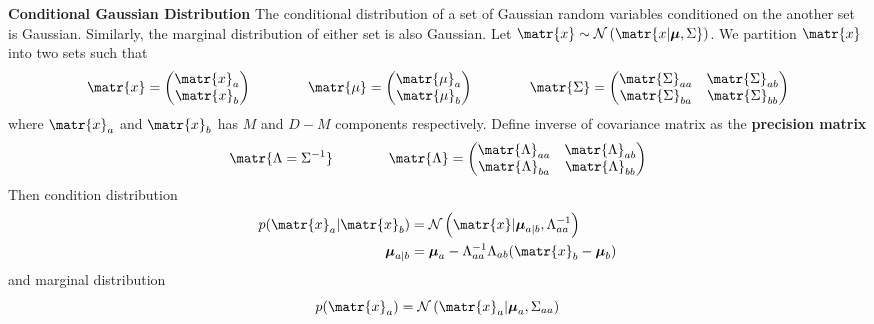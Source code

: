 \documentclass[11pt]{article}
\begin{document}
\begin{defn*}
    \textbf{Conditional Gaussian Distribution} The conditional distribution of a set of Gaussian random variables conditioned on the another set is Gaussian. Similarly, the marginal distribution of either set is also Gaussian. Let $\matr{x} \sim \normal{\matr{x | \bmu, \Sigma}}$. We partition $\matr{x}$ into two sets such that 
    \[
        \matr{x} = 
        \begin{pmatrix}
            \matr{x}_a \\ \matr{x}_b
        \end{pmatrix}    
        \quad \quad \quad \quad 
        \matr{\mu} = 
        \begin{pmatrix}
            \matr{\mu}_a \\
            \matr{\mu}_b \\ 
        \end{pmatrix}
        \quad \quad \quad \quad 
        \matr{\Sigma} = 
        \begin{pmatrix}
            \matr{\Sigma}_{aa} & \matr{\Sigma}_{ab} \\
            \matr{\Sigma}_{ba} & \matr{\Sigma}_{bb} \\
        \end{pmatrix}
    \]
    where $\matr{x}_a$ and $\matr{x}_b$ has $M$ and $D-M$ components respectively. Define inverse of covariance matrix as the \textbf{precision matrix}
    \[
        \matr{\Lambda = \Sigma^{-1}}    
        \quad \quad \quad \quad 
        \matr{\Lambda} = 
        \begin{pmatrix}
            \matr{\Lambda}_{aa} & \matr{\Lambda}_{ab} \\
            \matr{\Lambda}_{ba} & \matr{\Lambda}_{bb}\\
        \end{pmatrix}
    \]
    Then condition distribution 
    \begin{align*}
        p(\matr{x}_a | \matr{x}_b) &= \normal{\matr{x}| \bmu_{a|b}, \Lambda_{aa}^{-1}} \\
        \bmu_{a|b} &= \bmu_a - \Lambda_{aa}^{-1} \Lambda_{ab} (\matr{x}_b - \bmu_b)
    \end{align*}
    and marginal distribution 
    \[
        p(\matr{x}_a) = \normal{\matr{x}_a | \bmu_a, \Sigma_{aa}}    
    \]
\end{defn*}


\end{document}
